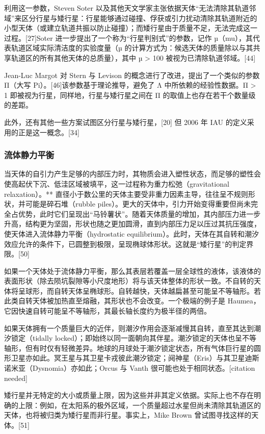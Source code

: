 利用这一参数，Steven Soter 以及其他天文学家主张依据天体“无法清除其轨道邻域”来区分行星与矮行星：行星能够通过碰撞、俘获或引力扰动清除其轨道附近的小型天体（或建立轨道共振以防止碰撞）；而矮行星由于质量不足，无法完成这一过程。[27]Soter 进一步提出了一个称为“行星判别式”的参数，记作 µ（mu），其代表轨道区域实际清洁度的实验度量（µ 的计算方式为：候选天体的质量除以与其共享轨道区的所有其他天体的总质量），其中  µ > 100 被视为已清除轨道邻域。[44]

Jean-Luc Margot 对 Stern 与 Levison 的概念进行了改进，提出了一个类似的参数 Π（大写 Pi）。[46]该参数基于理论推导，避免了 Λ 中所依赖的经验性数据。Π > 1 即被视为行星，同样地，行星与矮行星之间在 Π 的取值上也存在若干个数量级的差距。

此外，还有其他一些方案试图区分行星与矮行星，[20] 但 2006 年 IAU 的定义采用的正是这一概念。[34]
\subsubsection{流体静力平衡}
当天体的自引力产生足够的内部压力时，其物质会进入塑性状态，而足够的塑性会使高起伏下沉、低洼区域被填平，这一过程称为重力松弛（gravitational relaxation）。**
直径小于数公里的天体主要受非重力因素主导，往往呈不规则形状，并可能是碎石堆（rubble piles）。更大的天体中，引力开始变得重要但尚未完全占优势，此时它们呈现出“马铃薯状”。随着天体质量的增加，其内部压力进一步升高，结构更为坚固，形状也随之更加圆滑，直到内部压力足以压过其抗压强度，使天体进入流体静力平衡（hydrostatic equilibrium）。此时，天体在其自转和潮汐效应允许的条件下，已圆整到极限，呈现椭球体形状。这就是“矮行星”的判定界限。[50]

如果一个天体处于流体静力平衡，那么其表层若覆盖一层全球性的液体，该液体的表面形状（除去陨坑裂隙等小尺度地形）将与该天体整体的形状一致。不自转的天体将呈球形，而自转天体呈椭球形。自转越快，天体越扁甚至可能呈不等轴形。若此类自转天体被加热直至熔融，其形状也不会改变。一个极端的例子是 Haumea，它因快速自转可能呈不等轴形，其最长轴长度约为极半径的两倍。

如果天体拥有一个质量巨大的近伴，则潮汐作用会逐渐减慢其自转，直至其达到潮汐锁定（tidally locked）；即始终以同一面朝向其伴星。潮汐锁定的天体也呈不等轴形，但有时仅有轻微差异。地球的月球处于潮汐锁定状态，所有气体巨行星的圆形卫星亦如此。冥王星与其卫星卡戎彼此潮汐锁定；阋神星（Eris）与其卫星迪斯诺米亚（Dysnomia）亦如此；Orcus 与 Vanth 很可能也处于相同状态。[citation needed]

矮行星并无特定的大小或质量上限，因为这些并非其定义依据。实际上也不存在明确的上限：例如，在太阳系的极外区域，一个质量超过水星但尚未清除其轨道区的天体，也将被归类为矮行星而非行星。事实上，Mike Brown 曾试图寻找这样的天体。[51]

